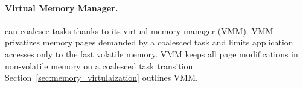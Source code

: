 \paragraph{Virtual Memory Manager.}
\sys can coalesce tasks thanks to its virtual memory manager (VMM). VMM privatizes memory pages demanded by a coalesced task and limits application accesses only to the fast volatile memory. VMM keeps all page modifications in non-volatile memory on a coalesced task transition. Section~\ref{sec:memory_virtulaization} outlines VMM.
